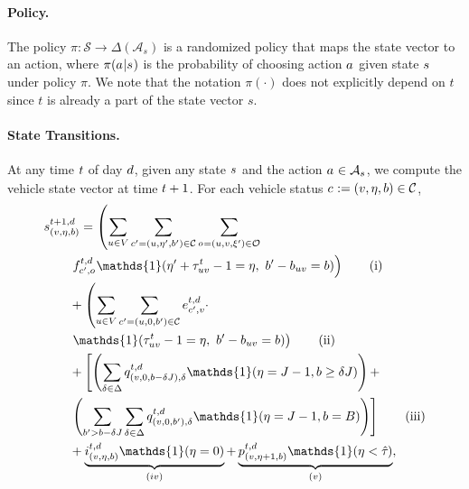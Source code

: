 \paragraph{Policy.} The policy $\pi: \mathcal{S} \rightarrow \Delta(\mathcal{A}_s)$ is a randomized policy that maps the state vector to an action, where $\pi(a^{}_{} \vert s_{}^{})$ is the probability of choosing action $a^{}_{}$ given state $s_{}^{}$ under policy $\pi$. We note that the notation $\pi(\cdot)$ does not explicitly depend on $t$ since $t$ is already a part of the state vector $s$.  

\paragraph{State Transitions.} At any time $t$ of day $d$, given any state $s_{}^{}$ and the action $a^{}_{} \in \mathcal{A}_{s_{}^{}}$, we compute the vehicle state vector at time $t+1$. 
For each vehicle status $c_{} := (v, \eta, b) \in \mathcal{C}$, %
\begin{align}
    &\state{(\destination, \eta, \battery)}{\time + 1, \day} = \left(\sum_{\origin \in \Region} \sum_{\cartype{}'= (\origin, \timetoarrival', \battery') \in \Cartype} \sum_{ \triptype{}= (\origin, \destination, \xi') \in \Triptype} \right. \nonumber\\
    &\qquad \left. \jointtripfulfillaction{\cartype{}', \triptype{}}{\time,\day}\mathds{1}(\timetoarrival' + \timecost{\origin\destination}{\time} - 1 = \timetoarrival, \  \battery' - \batterycost{\origin \destination} = \battery) \right) \tag{i} \\
    &\qquad+ \left(\sum_{\origin \in \Region} \sum_{\cartype{}'= (\origin, 0, \battery') \in \Cartype} \jointreroutingaction{\cartype{}', \destination}{\time,\day} \cdot \right. \nonumber\\
    &\qquad \left. \mathds{1}(\timecost{\origin\destination}{\time} - 1 = \timetoarrival, \  \battery' - \batterycost{\origin\destination} = \battery) \right) \tag{ii} \\
    &\qquad+ \left[ \left(\sum_{\type \in \Type} \jointchargingaction{(\destination, 0, \battery - \type \chargetime), \type}{\time,\day} \mathds{1}(\timetoarrival = \chargetime - 1, \battery \geq \type \chargetime) \right) + \right. \nonumber\\
    &\qquad \left. \left(\sum_{\battery' > \battery - \type \chargetime} \sum_{\type \in \Type} \jointchargingaction{(\destination, 0, \battery'), \type}{\time,\day} \mathds{1}(\timetoarrival = \chargetime - 1, \battery = \range) \right) \right] \tag{iii}\\
    &\qquad+ \underbrace{\jointidlingaction{(\destination, \timetoarrival, \battery)}{\time,\day} \mathds{1}(\timetoarrival = 0)}_{(iv)} + \underbrace{\jointpassaction{(\destination, \timetoarrival+1, \battery)}{\time,\day} \mathds{1}(\timetoarrival < \maxtimecost{})}_{(v)}, \label{eq:setup-car-state-transition}
\end{align}
